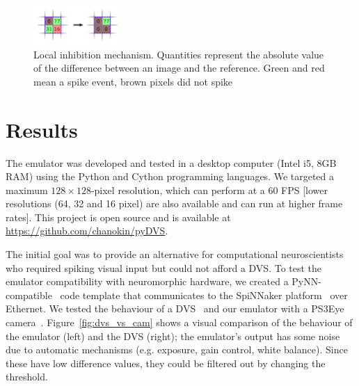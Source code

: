 \documentclass[conference]{IEEEtran}
\begin{document}
\begin{figure}[htb]
\centering
    \includegraphics[width=0.3\textwidth]{inh_local_max_img}
    \caption{Local inhibition mechanism. Quantities represent the absolute value of the difference between an image and the reference. Green and red mean a spike event, brown pixels did not spike}

  \label{fig:local_inh}
\end{figure}

\section{Results}
\label{sec:results}
The emulator was developed and tested in a desktop computer (Intel i5, 8GB RAM) using the Python and Cython programming languages. We targeted a maximum $128\times 128$-pixel resolution, which can perform at a 60 FPS [lower resolutions (64, 32 and 16 pixel) are also available and can run at higher frame rates]. This project is open source and is available at \url{https://github.com/chanokin/pyDVS}.

The initial goal was to provide an alternative for computational neuroscientists who required spiking visual input but could not afford a DVS. To test the emulator compatibility with neuromorphic hardware, we created a PyNN-compatible~\cite{pynn} code template that communicates to the SpiNNaker platform~\cite{spinnakerOverview} over Ethernet. We tested the behaviour of a DVS~\cite{bernabeDVS} and our emulator with a PS3Eye camera~\cite{wikipedia:ps3eye}. Figure~\ref{fig:dvs_vs_cam} shows a visual comparison of the behaviour of the emulator (left) and the DVS (right); the emulator's output has some noise due to automatic mechanisms (e.g. exposure, gain control, white balance). Since these have low difference values, they could be filtered out by changing the threshold.
\end{document}
